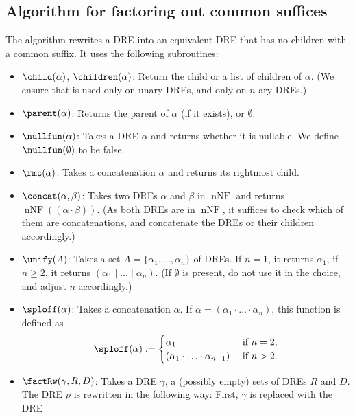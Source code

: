 \documentclass[a4paper,11pt, svgnames,titlepage]{article}
\newcommand{\rxc}{\cdot}
\DeclareMathOperator{\ror}{\mathtt{|}}
\newcommand{\df}{:=}
\DeclareMathOperator{\nnf}{nNF}
\begin{document}
\subsection{Algorithm for factoring out common suffices}\label{sec:factor}
The algorithm \factorOut rewrites a DRE into an equivalent DRE that has no children with a common suffix. It  uses the following subroutines:
\begin{itemize}
	\item $\child(\alpha)$, $\children(\alpha)$: Return the child or a list of children of $\alpha$. (We ensure that \child is used only on unary DREs, and \children only on $n$-ary DREs.)
	\item $\parent(\alpha)$: Returns the parent of $\alpha$ (if it exists), or $\emptyset$.
	\item $\nullfun(\alpha)$: Takes a DRE $\alpha$ and returns whether it is nullable. We define $\nullfun(\emptyset)$ to be false.
	\item $\rmc(\alpha)$: Takes a concatenation $\alpha$ and returns its rightmost child.
	\item $\concat(\alpha,\beta)$: Takes two DREs $\alpha$ and $\beta$ in $\nnf$ and returns $\nnf((\alpha\rxc\beta))$. (As both DREs are in $\nnf$, it suffices to check which of them are concatenations, and concatenate the DREs or their children accordingly.) 
	\item $\unify(A)$: Takes a set $A=\{\alpha_1,\ldots,\alpha_n\}$ of DREs. If $n=1$, it returns $\alpha_1$, if $n\geq 2$, it returns $(\alpha_1\ror\ldots\ror\alpha_n)$. (If $\emptyset$ is present, do not use it in the choice, and adjust $n$ accordingly.)
	\item $\sploff(\alpha)$: Takes a concatenation $\alpha$. If $\alpha=(\alpha_1\rxc\ldots\rxc \alpha_n)$, this function is defined as
	\[\sploff(\alpha)\df \begin{cases}
		\alpha_1 & \text{ if $n=2$},\\
		(\alpha_1\rxc\ldots\rxc \alpha_{n-1})& \text{ if $n>2$.}
	\end{cases}\]
	\item $\factRw(\gamma,R,D)$: Takes a DRE $\gamma$, a (possibly empty) sets of DREs $R$ and $D$. The DRE $\rho$ is  rewritten in the following way: First, $\gamma$ is replaced with the DRE 

\end{itemize}
\end{document}
